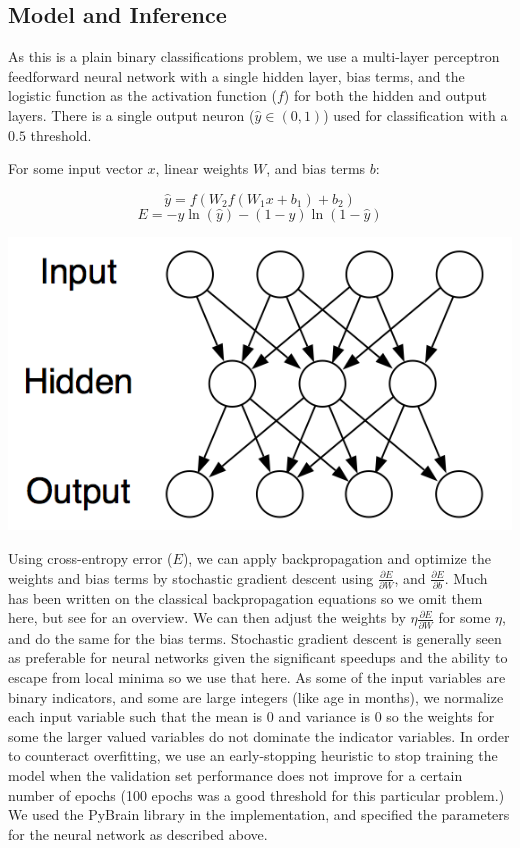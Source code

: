 \documentclass[a4paper]{article}
\theoremstyle{plain}
\begin{document}
\subsection{Model and Inference}

As this is a plain binary classifications problem, we use a multi-layer perceptron feedforward neural network with a single hidden layer, bias terms, and the logistic function as the activation function ($f$) for both the hidden and output layers. There is a single output neuron ($\hat{y} \in (0, 1)$) used for classification with a $0.5$ threshold.

For some input vector $x$, linear weights $W$, and bias terms $b$:

\[ \hat{y} = f( W_2  f( W_1 x + b_1 ) + b_2 ) \]
\[ E = - y \ln( \hat{y} ) - (1 - y) \ln ( 1 - \hat{y} ) \]

\begin{center}\vspace{1cm}
\includegraphics[width=0.6\linewidth]{neural_network}
\end{center}\vspace{1cm}

Using cross-entropy error ($E$), we can apply backpropagation and optimize the weights and bias terms by stochastic gradient descent using $\frac{\partial E}{\partial W}$, and $\frac{\partial E}{\partial b}$. Much has been written on the classical backpropagation equations so we omit them here, but see \cite{lecun-98b} for an overview. We can then adjust the weights by $\eta \frac{\partial E}{\partial W}$ for some $\eta$, and do the same for the bias terms. Stochastic gradient descent is generally seen as preferable for neural networks given the significant speedups and the ability to escape from local minima so we use that here.\cite{lecun-98b} As some of the input variables are binary indicators, and some are large integers (like age in months), we normalize each input variable such that the mean is $0$ and variance is $0$ so the weights for some the larger valued variables do not dominate the indicator variables. In order to counteract overfitting, we use an early-stopping heuristic to stop training the model when the validation set performance does not improve for a certain number of epochs (100 epochs was a good threshold for this particular problem.) We used the PyBrain library in the implementation, and specified the parameters for the neural network as described above.
\end{document}
